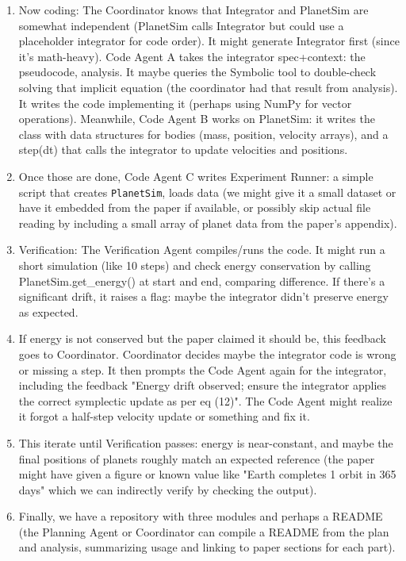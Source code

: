 \documentclass{ieeeaccess}
\begin{document}
\begin{enumerate}
\begin{itemize}
\end{itemize}
\item Now coding: The Coordinator knows that Integrator and PlanetSim are somewhat independent (PlanetSim calls Integrator but could use a placeholder integrator for code order). It might generate Integrator first (since it's math-heavy). Code Agent A takes the integrator spec+context: the pseudocode, analysis. It maybe queries the Symbolic tool to double-check solving that implicit equation (the coordinator had that result from analysis). It writes the code implementing it (perhaps using NumPy for vector operations). Meanwhile, Code Agent B works on PlanetSim: it writes the class with data structures for bodies (mass, position, velocity arrays), and a step(dt) that calls the integrator to update velocities and positions.
\item Once those are done, Code Agent C writes Experiment Runner: a simple script that creates \texttt{PlanetSim}, loads data (we might give it a small dataset or have it embedded from the paper if available, or possibly skip actual file reading by including a small array of planet data from the paper's appendix).
\item Verification: The Verification Agent compiles/runs the code. It might run a short simulation (like 10 steps) and check energy conservation by calling PlanetSim.get\_energy() at start and end, comparing difference. If there's a significant drift, it raises a flag: maybe the integrator didn't preserve energy as expected.
\item If energy is not conserved but the paper claimed it should be, this feedback goes to Coordinator. Coordinator decides maybe the integrator code is wrong or missing a step. It then prompts the Code Agent again for the integrator, including the feedback "Energy drift observed; ensure the integrator applies the correct symplectic update as per eq (12)". The Code Agent might realize it forgot a half-step velocity update or something and fix it.
\item This iterate until Verification passes: energy is near-constant, and maybe the final positions of planets roughly match an expected reference (the paper might have given a figure or known value like "Earth completes 1 orbit in 365 days" which we can indirectly verify by checking the output).
\item Finally, we have a repository with three modules and perhaps a README (the Planning Agent or Coordinator can compile a README from the plan and analysis, summarizing usage and linking to paper sections for each part).
\end{enumerate}
\end{document}
